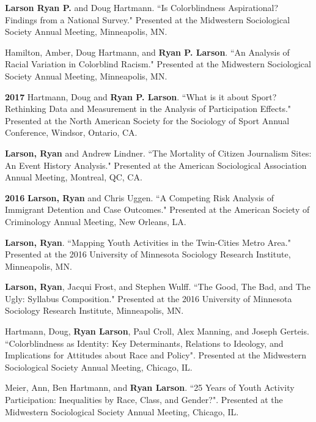 \documentclass[letterpaper]{article}
\newenvironment{publist}{%
  \begin{list}{}{%
    \setlength{\leftmargin}{0cm}   %
    \setlength{\labelwidth}{2cm}     %
    \setlength{\labelsep}{0.5cm}     %
  }%
}{%
  \end{list}%
}
\begin{document}
\begin{publist}
\item \textbf{Larson Ryan P.} and Doug Hartmann. ``Is Colorblindness Aspirational? Findings from a National Survey." Presented at the Midwestern Sociological Society Annual Meeting, Minneapolis, MN. 

\item Hamilton, Amber, Doug Hartmann, and \textbf{Ryan P. Larson}. ``An Analysis of Racial Variation in Colorblind Racism." Presented at the Midwestern Sociological Society Annual Meeting, Minneapolis, MN. 

\item[\textbf{2017}] Hartmann, Doug and \textbf{Ryan P. Larson}. ``What is it about Sport? Rethinking Data and Measurement in the Analysis of Participation Effects."  Presented at the North American Society for the Sociology of Sport Annual Conference, Windsor, Ontario, CA. 

\item \textbf{Larson, Ryan} and Andrew Lindner. ``The Mortality of Citizen Journalism Sites: An Event History Analysis." Presented at the American Sociological Association Annual Meeting, Montreal, QC, CA.

\item[\textbf{2016}] \textbf{Larson, Ryan} and Chris Uggen. ``A Competing Risk Analysis of Immigrant Detention and Case Outcomes." Presented at the American Society of Criminology Annual Meeting, New Orleans, LA. 

\item \textbf{Larson, Ryan}. ``Mapping Youth Activities in the Twin-Cities Metro Area." Presented at the 2016 University of Minnesota Sociology Research Institute, Minneapolis, MN. 

\item \textbf{Larson, Ryan}, Jacqui Frost, and Stephen Wulff. ``The Good, The Bad, and The Ugly: Syllabus Composition." Presented at the 2016 University of Minnesota Sociology Research Institute, Minneapolis, MN. 

\item Hartmann, Doug, \textbf{Ryan Larson}, Paul Croll, Alex Manning,  and Joseph Gerteis. ``Colorblindness as Identity:  Key Determinants, Relations to Ideology, and Implications for Attitudes about Race and Policy". Presented at the Midwestern Sociological Society Annual Meeting, Chicago, IL. 

\item Meier, Ann, Ben Hartmann, and \textbf{Ryan Larson}. ``25 Years of Youth Activity Participation: Inequalities by Race, Class, and Gender?". Presented at the Midwestern Sociological Society Annual Meeting, Chicago, IL. 


\end{publist}
\end{document}
